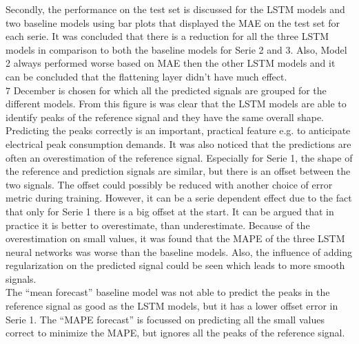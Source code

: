  Secondly, the performance on the test set is discussed for the LSTM models and two baseline models using bar plots that displayed the MAE on the test set for each serie. It was concluded that there is a reduction for all the three LSTM models in comparison to both the baseline models for Serie 2 and 3. Also, Model 2 always performed worse based on MAE then the other LSTM models and it can be concluded that the flattening layer didn't have much effect.\\ 
 $ 7 $ December is chosen for which all the predicted signals are grouped for the different models. From this figure is was clear that the LSTM models are able to identify peaks of the reference signal and they have the same overall shape. Predicting the peaks correctly is an important, practical feature e.g. to anticipate electrical peak consumption demands. It was also noticed that the predictions are often an overestimation of the reference signal. Especially for Serie 1, the shape of the reference and prediction signals are similar, but there is an offset between the two signals. The offset could possibly be reduced with another choice of error metric during training. However, it can be a serie dependent effect due to the fact that only for Serie 1 there is a big offset at the start. It can be argued that in practice it is better to overestimate, than underestimate. Because of the overestimation on small values, it was found that the MAPE of the three LSTM neural networks was worse than the baseline models. Also, the influence of adding regularization on the predicted signal could be seen which leads to more smooth signals.\\
 
The ``mean forecast'' baseline model was not able to predict the peaks in the reference signal as good as the LSTM models, but it has a lower offset error in Serie 1. The ``MAPE forecast'' is focussed on predicting all the small values correct to minimize the MAPE, but ignores all the peaks of the reference signal.
 


